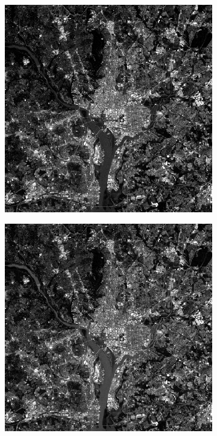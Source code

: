 \begin{figure}[h!]
	\centering
	\begin{subfigure}[b]{0.3\linewidth}
		\includegraphics[width=\linewidth]{myfigure/p10/WashingtonDC_Band1.png}
		\caption{}
		\label{fig:band1}
	\end{subfigure}
	\begin{subfigure}[b]{0.3\linewidth}
		\includegraphics[width=\linewidth]{myfigure/p10/WashingtonDC_Band2.png}

\end{subfigure}
\end{figure}
